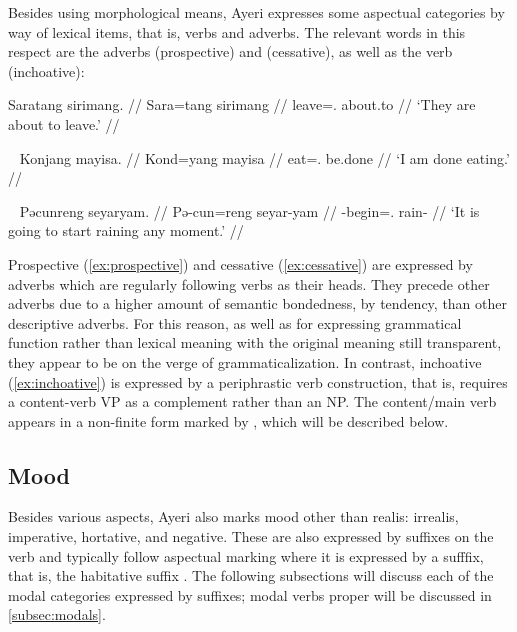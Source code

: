 Besides using morphological means, Ayeri expresses some aspectual categories by 
way of lexical items, that is, verbs and adverbs. The relevant words in this 
respect are the adverbs  (prospective) and 
 (cessative), as well as 
the verb  (inchoative):

\ex\label{ex:prospective}\begingl
	\gla Saratang sirimang. //
	\glb Sara=tang sirimang //
	\glc leave=\TplM{}.\Aarg{} about.to //
	\glft `They are about to leave.' //
\endgl\xe

\ex~\label{ex:cessative}\begingl
	\gla Konjang mayisa. //
	\glb Kond=yang mayisa //
	\glc eat=\Fsg.\Aarg{} be.done //
	\glft `I am done eating.' //
\endgl\xe

\ex~\label{ex:inchoative}\begingl
	\gla Pəcunreng seyaryam. //
	\glb Pə-cun=reng seyar-yam //
	\glc \NFut{}-begin=\TsgI{}.\Aarg{} rain-\Ptcp{} //
	\glft `It is going to start raining any moment.' //
\endgl\xe

Prospective  (\ref{ex:prospective}) and cessative 
 (\ref{ex:cessative}) are expressed by adverbs which are 
regularly following verbs as their heads. They precede other adverbs due to a 
higher amount of semantic bondedness, by tendency, than other descriptive 
adverbs. For this reason, as well as for expressing grammatical function rather 
than lexical meaning with the original meaning still transparent, they appear to 
be on the verge of grammaticalization. In contrast, inchoative 
 (\ref{ex:inchoative}) is expressed by a periphrastic verb 
construction, that is,  requires a content-verb VP as a 
complement rather than an NP. The content/main verb appears in a non-finite 
form marked by , which will be described below.

\subsection{Mood}
\label{subsec:mood}

Besides various aspects, Ayeri also marks mood other than realis: irrealis, 
imperative, hortative, and negative. These are also expressed by suffixes on the 
verb and typically follow aspectual marking where it is expressed by a sufffix, 
that is, the habitative suffix . The following subsections will 
discuss each of the modal categories expressed by suffixes; modal verbs proper 
will be discussed in \autoref{subsec:modals}.

